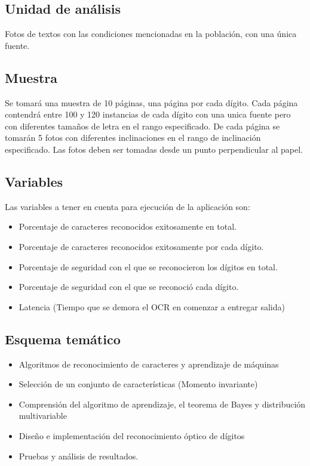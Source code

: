 \documentclass[a4paper, 11pt, oneside]{article}
\begin{document}
	\subsection{Unidad de análisis}
	Fotos de textos con las condiciones mencionadas en la población, con una única fuente.

	\subsection{Muestra}
	Se tomará una muestra de 10 páginas, una página por cada dígito. Cada página contendrá entre 100
	y 120 instancias de cada dígito con una unica fuente pero con diferentes tamaños de letra en el
	rango especificado. De cada página se tomarán 5 fotos con diferentes inclinaciones en el rango
	de inclinación especificado. Las fotos deben ser tomadas desde un punto perpendicular al papel.
	
	\subsection{Variables}
	Las variables a tener en cuenta para ejecución de la aplicación son:
	\begin{itemize}
	\item Porcentaje de caracteres reconocidos exitosamente en total.
	\item Porcentaje de caracteres reconocidos exitosamente por cada dígito.
	\item Porcentaje de seguridad con el que se reconocieron los dígitos en total.
	\item Porcentaje de seguridad con el que se reconoció cada dígito.
	\item Latencia (Tiempo que se demora el OCR en comenzar a entregar salida)
	\end{itemize}
		
	\subsection{Esquema temático}
	\begin{itemize}
		\item Algoritmos de reconocimiento de caracteres y aprendizaje de máquinas
		\item Selección de un conjunto de características (Momento invariante)
		\item Comprensión del algoritmo de aprendizaje, el teorema de Bayes y distribución multivariable
		\item Diseño e implementación del reconocimiento óptico de dígitos
		\item Pruebas y análisis de resultados.
	\end{itemize}
	\clearpage
	
\end{document}
